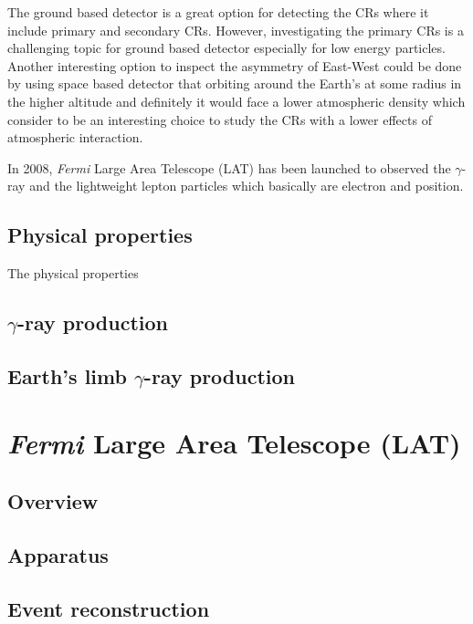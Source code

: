 The ground based detector is a great option for 
detecting the CRs where it include primary and secondary CRs.
However, investigating the primary CRs is a challenging topic
for ground based detector especially for low energy particles.
Another interesting option to inspect the asymmetry of 
East-West could be done by using space based detector 
that orbiting around the Earth's at some radius in the
higher altitude and definitely it would face a lower 
atmospheric density which consider to be an interesting 
choice to study the CRs with a lower effects of atmospheric
interaction.

In 2008, \textit{Fermi} Large Area Telescope (LAT)
has been launched to observed the $\gamma$-ray and the
lightweight lepton particles which basically are electron
and position. 

\subsection{Physical properties}
The physical properties


\subsection{$\gamma$-ray production}

\subsection{Earth's limb $\gamma$-ray production}

\section{\textit{Fermi} Large Area Telescope (LAT)}

\subsection{Overview}

\subsection{Apparatus}

\subsection{Event reconstruction}




